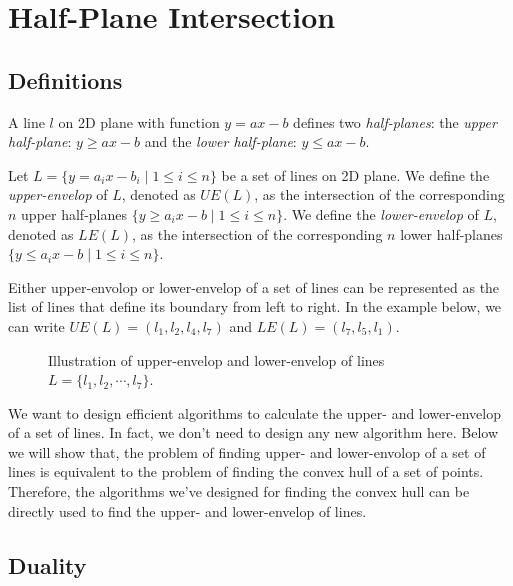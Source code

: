 \section*{Half-Plane Intersection}

\subsection*{Definitions}

\begin{definition}
A line $l$ on 2D plane with function $y = ax - b$ defines two \emph{half-planes}:
the \emph{upper half-plane}: $y \ge ax -b$ and the \emph{lower half-plane}: $y \le ax -b$.
\end{definition}

\begin{definition}
Let $L = \{y = a_i x - b_i \mid 1 \le i \le n \}$ be a set of lines on 2D plane.
We define the \emph{upper-envelop} of $L$, denoted as $UE(L)$, as the intersection of
the corresponding $n$ upper half-planes $\{y \ge a_i x -b \mid 1 \le i \le n \}$.
We define the \emph{lower-envelop} of $L$, denoted as $LE(L)$, as the intersection of
the corresponding $n$ lower half-planes $\{y \le a_i x -b \mid 1 \le i \le n \}$.
\end{definition}

Either upper-envolop or lower-envelop of a set of lines can be represented
as the list of lines that define its boundary from left to right. In the example
below, we can write $UE(L) = (l_1, l_2, l_4, l_7)$
and $LE(L) = (l_7, l_5, l_1)$.

\begin{figure}[h!]
\centering{}
\caption{Illustration of upper-envelop and lower-envelop of lines $L = \{l_1, l_2, \cdots, l_7\}$.}
\end{figure}

We want to design efficient algorithms to calculate the upper- and lower-envelop of a set of lines.
In fact, we don't need to design any new algorithm here. Below we will show that, the problem of finding
upper- and lower-envolop of a set of lines is equivalent to the problem of finding the convex hull
of a set of points. Therefore, the algorithms we've designed for finding the convex hull can be
directly used to find the upper- and lower-envelop of lines.


\subsection*{Duality}

